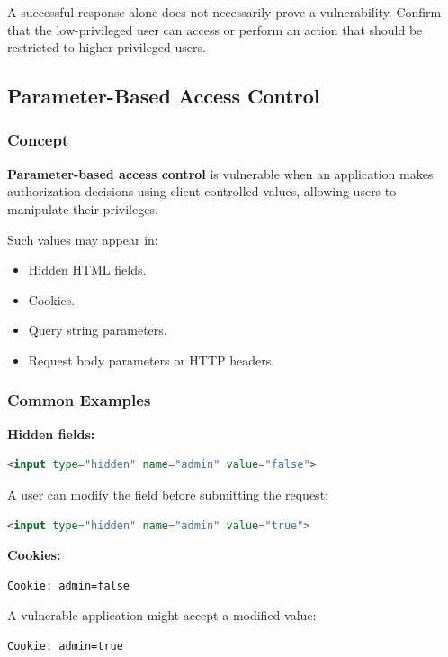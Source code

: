 \documentclass[11pt,a4paper]{article}
\begin{document}
A successful response alone does not necessarily prove a vulnerability. Confirm that the low-privileged user can access or perform an action that should be restricted to higher-privileged users.

\subsection{Parameter-Based Access Control}

\subsubsection{Concept}

\textbf{Parameter-based access control} is vulnerable when an application makes authorization decisions using client-controlled values, allowing users to manipulate their privileges.

Such values may appear in:
\begin{itemize}
    \item Hidden HTML fields.
    \item Cookies.
    \item Query string parameters.
    \item Request body parameters or HTTP headers.
\end{itemize}

\subsubsection{Common Examples}

\textbf{Hidden fields:}
\begin{lstlisting}[language=HTML]
<input type="hidden" name="admin" value="false">
\end{lstlisting}

A user can modify the field before submitting the request:
\begin{lstlisting}[language=HTML]
<input type="hidden" name="admin" value="true">
\end{lstlisting}

\textbf{Cookies:}
\begin{lstlisting}[language=HTTP]
Cookie: admin=false
\end{lstlisting}

A vulnerable application might accept a modified value:
\begin{lstlisting}[language=HTTP]
Cookie: admin=true
\end{lstlisting}
\end{document}
